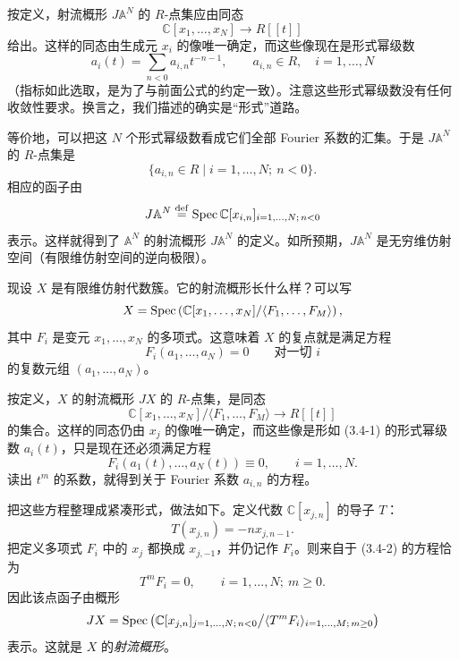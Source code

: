 按定义，射流概形 $J\mathbb{A}^N$ 的 $R$-点集应由同态
\[
    \mathbb{C}[x_1,\dots,x_N]\longrightarrow R[[t]]
\]
给出。这样的同态由生成元 $x_i$ 的像唯一确定，而这些像现在是形式幂级数
\begin{equation}
    a_i(t)=\sum_{n<0} a_{i,n} t^{-n-1},\qquad a_{i,n}\in R,\quad i=1,\dots,N
    \tag{3.4-1}
\end{equation}
（指标如此选取，是为了与前面公式的约定一致）。注意这些形式幂级数没有任何收敛性要求。换言之，我们描述的确实是“形式”道路。

等价地，可以把这 $N$ 个形式幂级数看成它们全部 Fourier 系数的汇集。于是 $J\mathbb{A}^N$ 的 $R$-点集是
\[
    \{a_{i,n}\in R \mid i=1,\dots,N;\ n<0\}.
\]
相应的函子由
\[
    J\mathbb{A}^N \overset{\mathrm{def}}{=} \operatorname{Spec}\mathbb{C}[x_{i,n}]_{i=1,\dots,N;\,n<0}
\]
表示。这样就得到了 $\mathbb{A}^N$ 的射流概形 $J\mathbb{A}^N$ 的定义。如所预期，$J\mathbb{A}^N$ 是无穷维仿射空间（有限维仿射空间的逆向极限）。


现设 $X$ 是有限维仿射代数簇。它的射流概形长什么样？可以写
\[
    X=\operatorname{Spec}\left(\mathbb{C}[x_1,\dots,x_N]/\langle F_1,\dots,F_M\rangle\right),
\]
其中 $F_i$ 是变元 $x_1,\dots,x_N$ 的多项式。这意味着 $X$ 的复点就是满足方程
\[
    F_i(a_1,\dots,a_N)=0\qquad\text{对一切 } i
\]
的复数元组 $(a_1,\dots,a_N)$。

按定义，$X$ 的射流概形 $JX$ 的 $R$-点集，是同态
\[
    \mathbb{C}[x_1,\dots,x_N]/\langle F_1,\dots,F_M\rangle\longrightarrow R[[t]]
\]
的集合。这样的同态仍由 $x_j$ 的像唯一确定，而这些像是形如 (3.4-1) 的形式幂级数 $a_i(t)$，只是现在还必须满足方程
\begin{equation}
    F_i(a_1(t),\dots,a_N(t))\equiv 0,\qquad i=1,\dots,N.
    \tag{3.4-2}
\end{equation}
读出 $t^m$ 的系数，就得到关于 Fourier 系数 $a_{i,n}$ 的方程。

把这些方程整理成紧凑形式，做法如下。定义代数 $\mathbb{C}[x_{j,n}]$ 的导子 $T$：
\[
    T(x_{j,n})=-n x_{j,n-1}.
\]
把定义多项式 $F_i$ 中的 $x_j$ 都换成 $x_{j,-1}$，并仍记作 $F_i$。则来自于 (3.4-2) 的方程恰为
\[
    T^m F_i=0,\qquad i=1,\dots,N;\ m\ge 0.
\]
因此该点函子由概形
\[
    JX=\operatorname{Spec}\left(\mathbb{C}[x_{j,n}]_{j=1,\dots,N;\,n<0}\big/\langle T^m F_i\rangle_{i=1,\dots,M;\,m\ge 0}\right)
\]
表示。这就是 $X$ 的\emph{射流概形}。

